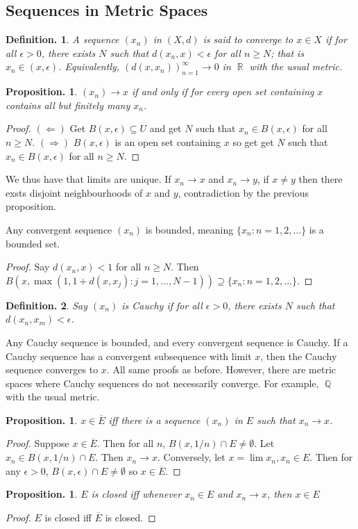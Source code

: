 \documentclass[11pt, a4paper]{memoir}
\DeclareMathOperator{\Q}{{\mathbb{Q}}}
\DeclareMathOperator{\R}{{\mathbb{R}}}
\theoremstyle{change}
\newtheorem{proposition}[theorem]{Proposition.}
\theoremstyle{plain}
\theoremstyle{nonumberplain}
\newtheorem{definition}{Definition.}
\newtheorem{proof}{Proof}
\numberwithin{equation}{section}
\begin{document}
\subsection{Sequences in Metric Spaces}
\begin{definition}
    A sequence $(x_n)$ in $(X,d)$ is said to converge to $x\in X$ if for all $\epsilon>0$, there exists $N$ such that
    $d(x_n,x)<\epsilon$ for all $n\geq N$; that is $x_n\in (x,\epsilon)$. Equivalently, $(d(x,x_n))_{n=1}^\infty\to 0$ in
    $\R$ with the usual metric.
\end{definition}
\begin{proposition}
    $(x_n)\to x$ if and only if for every open set containing $x$ contains all but
    finitely many $x_n$.
\end{proposition}
\begin{proof}
    $(\Leftarrow)$ Get $B(x,\epsilon)\subseteq U$ and get $N$ such that $x_n\in B(x,\epsilon)$ for all $n\geq N$.
    $(\Rightarrow)$ $B(x,\epsilon)$ is an open set containing $x$ so get get $N$ such that $x_n\in B(x,\epsilon)$ for all $n\geq N$.
\end{proof}
We thus have that limits are unique. If $x_n\to x$ and $x_n\to y$, if $x\neq y$ then there exsts disjoint neighbourhoods
of $x$ and $y$, contradiction by the previous proposition.

Any convergent sequence $(x_n)$ is bounded, meaning $\{x_n:n=1,2,\ldots\}$ is a bounded set.
\begin{proof}
    Say $d(x_n,x)<1$ for all $n\geq N$. Then $B(x,\max(1,1+d(x,x_j):j=1,\ldots,N-1))\supseteq\{x_n:n=1,2,\ldots\}$.
\end{proof}
\begin{definition}
    Say $(x_n)$ is \textit{Cauchy} if for all $\epsilon>0$, there exists $N$ such that $d(x_n,x_m)<\epsilon$.
\end{definition}
Any Cauchy sequence is bounded, and every convergent sequence is Cauchy. If a Cauchy sequence has a convergent subsequence
with limit $x$, then the Cauchy sequence converges to $x$. All same proofs as before. However, there are metric spaces where Cauchy
sequences do not necessarily converge. For example, $\Q$ with the usual metric.
\begin{proposition}
    $x\in\overline{E}$ iff there is a sequence $(x_n)$ in $E$ such that $x_n\to x$.
\end{proposition}
\begin{proof}
    Suppose $x\in\overline{E}$. Then for all $n$, $B(x,1/n)\cap E\neq\emptyset$. Let $x_n\in B(x,1/n)\cap E$. Then $x_n\to x$.
    Conversely, let $x=\lim x_n,x_n\in E$. Then for any $\epsilon>0$, $B(x,\epsilon)\cap E\neq\emptyset$ so $x\in\overline{E}$.
\end{proof}
\begin{proposition}
    $E$ is closed iff whenever $x_n\in E$ and $x_n\to x$, then $x\in E$
\end{proposition}
\begin{proof}
    $E$ is closed iff $\overline{E}$ is closed.
\end{proof}
\end{document}
